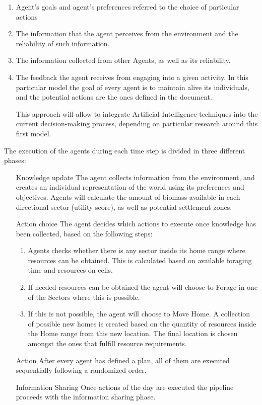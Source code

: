 \documentclass[11pt,oneside,a4paper,openright]{report}
\begin{document}


\begin{enumerate}
	\item Agent's goals and agent's preferences referred to the choice of particular actions
	\item The information that the agent perceives from the environment and the reliability of such
	information.
	\item The information collected from other Agents, as well as its reliability.
	\item The feedback the agent receives from engaging into a given activity.
	In this particular model the goal of every agent is to maintain alive its individuals, and the potential
	actions are the ones defined in the document.



 This approach will allow to integrate Artificial
	Intelligence techniques into the current decision-making process, depending on particular research
	around this first model.

\end{enumerate}


The execution of the agents during each time step is divided in three different phases:
\begin{enumerate}[1.]
	\item[Knowledge update]
	The agent collects information from the environment, and creates an individual representation of the
	world using its preferences and objectives. Agents will calculate the amount of biomass available in
	each directional sector (utility score), as well as potential settlement zones.
	\item[Action choice]
	The agent decides which actions to execute once knowledge has been collected, based on the
	following steps:
	\begin{enumerate}
		\item Agents checks whether there is any sector inside its home range where resources can be
		obtained. This is calculated based on available foraging time and resources on cells.
		\item If needed resources can be obtained the agent will choose to Forage in one of the Sectors
		where this is possible.
		\item If this is not possible, the agent will choose to Move Home. A collection of possible new homes
		is created based on the quantity of resources inside the Home range from this new location.
		The final location is chosen amongst the ones that fulfill resource requirements.
	\end{enumerate}
	\item[Action]
	After every agent has defined a plan, all of them are executed sequentially following a randomized
	order.
	\item[Information Sharing] 
	Once actions of the day are executed the pipeline proceeds with the information
	sharing phase.
\end{enumerate}
\end{document}
